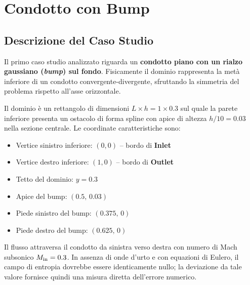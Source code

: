 \chapter{Condotto con Bump}
\label{cap:bump}

\section{Descrizione del Caso Studio}

Il primo caso studio analizzato riguarda un \textbf{condotto piano con un rialzo gaussiano
(\textit{bump}) sul fondo}. Fisicamente il dominio rappresenta la metà inferiore di un condotto
convergente-divergente, sfruttando la simmetria del problema rispetto all'asse orizzontale.

Il dominio è un rettangolo di dimensioni $L \times h = 1 \times 0.3$ sul quale la parete
inferiore presenta un ostacolo di forma spline con apice di altezza $h/10 = 0.03$ nella
sezione centrale. Le coordinate caratteristiche sono:
\begin{itemize}
  \item Vertice sinistro inferiore: $(0, 0)$ -- bordo di \textbf{Inlet}
  \item Vertice destro inferiore: $(1, 0)$ -- bordo di \textbf{Outlet}
  \item Tetto del dominio: $y = 0.3$
  \item Apice del bump: $(0.5,\, 0.03)$
  \item Piede sinistro del bump: $(0.375,\, 0)$
  \item Piede destro del bump: $(0.625,\, 0)$
\end{itemize}

Il flusso attraversa il condotto da sinistra verso destra con numero di Mach subsonico
$M_{\rm in} = 0.3$. In assenza di onde d'urto e con equazioni di Eulero, il campo di entropia
dovrebbe essere identicamente nullo; la deviazione da tale valore fornisce quindi una misura
diretta dell'errore numerico.

